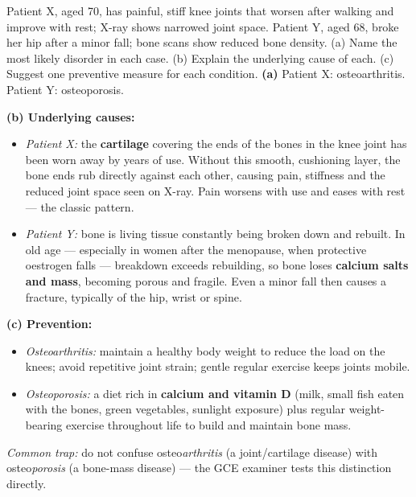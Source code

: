 \documentclass[11pt]{article}
\newcommand{\cle}[1]{{\popxbold\color{popdark}#1}}
\begin{document}
\begin{exoresolu}
Patient X, aged 70, has painful, stiff knee joints that worsen after walking and improve with rest; X-ray shows narrowed joint space. Patient Y, aged 68, broke her hip after a minor fall; bone scans show reduced bone density. (a) Name the most likely disorder in each case. (b) Explain the underlying cause of each. (c) Suggest one preventive measure for each condition.
\tcblower
\textbf{(a)} Patient X: \cle{osteoarthritis}. Patient Y: \cle{osteoporosis}.

\textbf{(b) Underlying causes:}
\begin{itemize}
\item \emph{Patient X:} the \textbf{cartilage} covering the ends of the bones in the knee joint has been worn away by years of use. Without this smooth, cushioning layer, the bone ends rub directly against each other, causing pain, stiffness and the reduced joint space seen on X-ray. Pain worsens with use and eases with rest — the classic pattern.
\item \emph{Patient Y:} bone is living tissue constantly being broken down and rebuilt. In old age — especially in women after the menopause, when protective oestrogen falls — breakdown exceeds rebuilding, so bone loses \textbf{calcium salts and mass}, becoming porous and fragile. Even a minor fall then causes a fracture, typically of the hip, wrist or spine.
\end{itemize}

\textbf{(c) Prevention:}
\begin{itemize}
\item \emph{Osteoarthritis:} maintain a healthy body weight to reduce the load on the knees; avoid repetitive joint strain; gentle regular exercise keeps joints mobile.
\item \emph{Osteoporosis:} a diet rich in \textbf{calcium and vitamin D} (milk, small fish eaten with the bones, green vegetables, sunlight exposure) plus regular weight-bearing exercise throughout life to build and maintain bone mass.
\end{itemize}

\emph{Common trap:} do not confuse osteo\emph{arthritis} (a joint/cartilage disease) with osteo\emph{porosis} (a bone-mass disease) — the GCE examiner tests this distinction directly.
\end{exoresolu}
\end{document}
